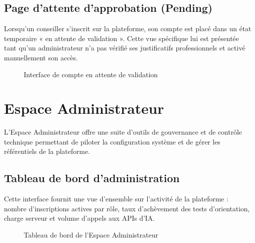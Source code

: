 \subsection{Page d'attente d'approbation (Pending)}

Lorsqu'un conseiller s'inscrit sur la plateforme, son compte est placé dans un état temporaire « en attente de validation ». Cette vue spécifique lui est présentée tant qu'un administrateur n'a pas vérifié ses justificatifs professionnels et activé manuellement son accès.

\begin{figure}[H]
    \centering
    \caption{Interface de compte en attente de validation}
    \label{fig:interface_pending_counselor}
\end{figure}

\section{Espace Administrateur}

L'Espace Administrateur offre une suite d'outils de gouvernance et de contrôle technique permettant de piloter la configuration système et de gérer les référentiels de la plateforme.

\subsection{Tableau de bord d'administration}

Cette interface fournit une vue d'ensemble sur l'activité de la plateforme : nombre d'inscriptions actives par rôle, taux d'achèvement des tests d'orientation, charge serveur et volume d'appels aux APIs d'IA.

\begin{figure}[H]
    \centering
    \caption{Tableau de bord de l'Espace Administrateur}
    \label{fig:interface_dashboard_admin}
\end{figure}

